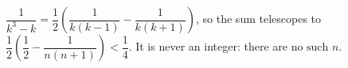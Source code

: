 $\dfrac1{k^3-k}=\dfrac12\left(\dfrac1{k(k-1)}-\dfrac1{k(k+1)}\right)$, so the sum telescopes to $\dfrac12\left(\dfrac12-\dfrac1{n(n+1)}\right)<\dfrac14$. It is never an integer: there are $\boxed{\text{no such }n}$.
